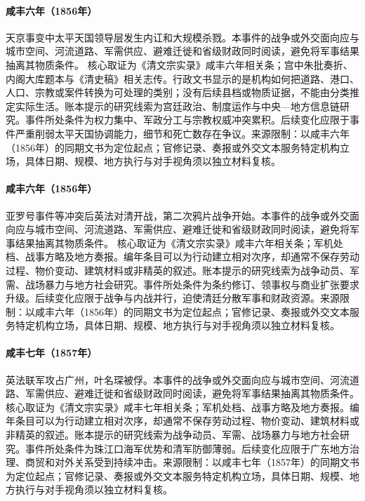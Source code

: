 \hypertarget{civic:EQ-1856-TIANJING-INCIDENT}{}\paragraph{咸丰六年（1856年）}天京事变中太平天国领导层发生内讧和大规模杀戮。本事件的战争或外交面向应与城市空间、河流道路、军需供应、避难迁徙和省级财政同时阅读，避免将军事结果抽离其物质条件。 核心取证为《清文宗实录》咸丰六年相关条；宫中朱批奏折、内阁大库题本与《清史稿》相关志传。行政文书显示的是机构如何把道路、港口、人口、宗教或案件转换为可处理的类别；没有后续县档或物质证据，不能由分类推定实际生活。账本提示的研究线索为宫廷政治、制度运作与中央—地方信息链研究。事件所处条件为权力集中、军政分工与宗教权威冲突累积。后续变化应限于事件严重削弱太平天国协调能力，细节和死亡数存在争议。来源限制：以咸丰六年（1856年）的同期文书为定位起点；官修记录、奏报或外交文本服务特定机构立场，具体日期、规模、地方执行与对手视角须以独立材料复核。
\hypertarget{civic:EQ-1856-SECOND-OPIUM-WAR-BEGIN}{}\paragraph{咸丰六年（1856年）}亚罗号事件等冲突后英法对清开战，第二次鸦片战争开始。本事件的战争或外交面向应与城市空间、河流道路、军需供应、避难迁徙和省级财政同时阅读，避免将军事结果抽离其物质条件。 核心取证为《清文宗实录》咸丰六年相关条；军机处档、战事方略及地方奏报。编年条目可以为行动建立相对次序，却通常不保存劳动过程、物价变动、建筑材料或非精英的叙述。账本提示的研究线索为战争动员、军需、战场暴力与地方社会研究。事件所处条件为条约修订、领事权与商业扩张要求升级。后续变化应限于战争与内战并行，迫使清廷分散军事和财政资源。来源限制：以咸丰六年（1856年）的同期文书为定位起点；官修记录、奏报或外交文本服务特定机构立场，具体日期、规模、地方执行与对手视角须以独立材料复核。
\hypertarget{civic:EQ-1857-GUANGZHOU-FALL}{}\paragraph{咸丰七年（1857年）}英法联军攻占广州，叶名琛被俘。本事件的战争或外交面向应与城市空间、河流道路、军需供应、避难迁徙和省级财政同时阅读，避免将军事结果抽离其物质条件。 核心取证为《清文宗实录》咸丰七年相关条；军机处档、战事方略及地方奏报。编年条目可以为行动建立相对次序，却通常不保存劳动过程、物价变动、建筑材料或非精英的叙述。账本提示的研究线索为战争动员、军需、战场暴力与地方社会研究。事件所处条件为珠江口海军优势和清军防御薄弱。后续变化应限于广东地方治理、商贸和对外关系受到持续冲击。来源限制：以咸丰七年（1857年）的同期文书为定位起点；官修记录、奏报或外交文本服务特定机构立场，具体日期、规模、地方执行与对手视角须以独立材料复核。

